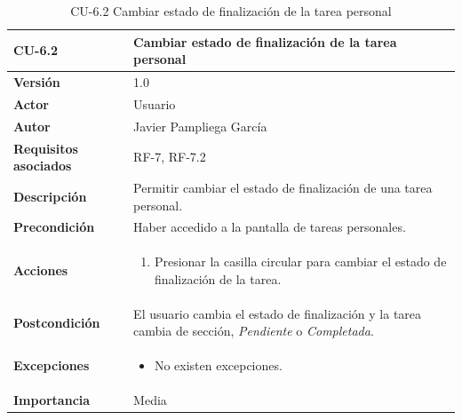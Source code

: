 \begin{table}[p]
	\centering
	\begin{tabularx}{\linewidth}{ p{} p{} }
		\toprule
		\textbf{CU-6.2}    & \textbf{Cambiar estado de finalización de la tarea personal}\\
		\toprule
		\textbf{Versión}              & 1.0    \\
            \textbf{Actor}                & Usuario \\
		\textbf{Autor}                & Javier Pampliega García \\
		\textbf{Requisitos asociados} & RF-7, RF-7.2\\
		\textbf{Descripción}          & Permitir cambiar el estado de finalización de una tarea personal. \\
		\textbf{Precondición}         & Haber accedido a la pantalla de tareas personales. \\
		\textbf{Acciones}             &
		\begin{enumerate}
			\def\labelenumi{\arabic{enumi}.}
			\tightlist
			\item Presionar la casilla circular para cambiar el estado de finalización de la tarea.
		\end{enumerate}\\
		\textbf{Postcondición}        & El usuario cambia el estado de finalización y la tarea cambia de sección, \textit{Pendiente} o \textit{Completada}. \\
		\textbf{Excepciones}          & \begin{itemize}
		    \item No existen excepciones.
		\end{itemize} \\
		\textbf{Importancia}          & Media \\
		\bottomrule
	\end{tabularx}
	\caption{CU-6.2 Cambiar estado de finalización de la tarea personal}
\end{table}

